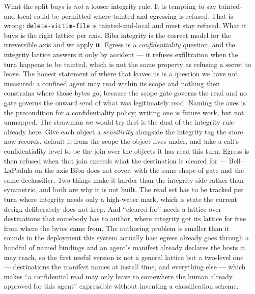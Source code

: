 \documentclass[11pt]{article}
\newcommand{\code}[1]{\texttt{#1}}
\begin{document}
What the split buys is \emph{not} a looser integrity rule. It is tempting to say
tainted-and-local could be permitted where tainted-and-egressing is refused.
That is wrong: \code{delete-victim-file} is tainted-and-local and must stay
refused. What it buys is the right lattice per axis. Biba integrity is
the correct model for the irreversible axis and we apply it. Egress is a
\emph{confidentiality} question, and the integrity lattice answers it only by
accident --- it refuses exfiltration when the turn happens to be tainted, which
is not the same property as refusing a secret to leave. The honest statement of
where that leaves us is a question we have not measured: a confined agent may
read within its scope and nothing then constrains where those bytes go, because
the scope gate governs the read and no gate governs the onward send of what was
legitimately read. Naming the axes is the precondition for a confidentiality
policy; writing one is future work, but not unmapped. The strawman we would try
first is the dual of the integrity rule already here. Give each object a
\emph{sensitivity} alongside the integrity tag the store now records, default it
from the scope the object lives under, and take a call's confidentiality level to
be the join over the objects it has read this turn. Egress is then refused when
that join exceeds what the destination is cleared for --- Bell--LaPadula on the
axis Biba does not cover, with the same shape of gate and the same declassifier.
Two things make it harder than the integrity side rather than symmetric, and both
are why it is not built. The read set has to be tracked per turn where integrity
needs only a high-water mark, which is state the current design deliberately does
not keep. And ``cleared for'' needs a lattice over destinations that somebody has
to author, where integrity got its lattice for free from where the bytes came
from. The authoring problem is smaller than it sounds in the deployment this
system actually has: egress already goes through a handful of named bindings and
an agent's manifest already declares the hosts it may reach, so the first useful
version is not a general lattice but a two-level one --- destinations the
manifest names at install time, and everything else --- which makes ``a
confidential read may only leave to somewhere the human already approved for this
agent'' expressible without inventing a classification scheme.
\end{document}

